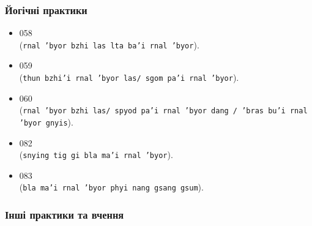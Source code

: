 \documentclass{article}
\begin{document}
\subsubsection{Йогічні практики}

\begingroup\raggedright
\begin{itemize}
\item 058  \\ (\texttt{rnal 'byor bzhi las lta ba'i rnal 'byor}).
\item 059  \\ (\texttt{thun bzhi'i rnal 'byor las/ sgom pa'i rnal 'byor}).
\item 060  \\ (\texttt{rnal 'byor bzhi las/ spyod pa'i rnal 'byor dang / 'bras bu'i rnal 'byor gnyis}).
\item 082  \\ (\texttt{snying tig gi bla ma'i rnal 'byor}).
\item 083  \\ (\texttt{bla ma'i rnal 'byor phyi nang gsang gsum}).
\end{itemize}
\endgroup

\subsubsection{Інші практики та вчення}
\end{document}

